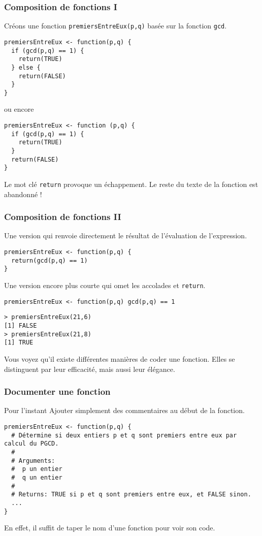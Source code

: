 \documentclass[10pt]{beamer}
\begin{document}
\begin{frame}[fragile]
  \frametitle{Composition de fonctions I}
  Créons une fonction \texttt{premiersEntreEux(p,q)} basée sur la fonction \texttt{gcd}.
  \begin{lstlisting}[style=editor]
premiersEntreEux <- function(p,q) {
  if (gcd(p,q) == 1) {
    return(TRUE)
  } else {
    return(FALSE)
  }
}    
\end{lstlisting}
ou encore
\begin{lstlisting}[style=editor]
premiersEntreEux <- function (p,q) {
  if (gcd(p,q) == 1) {
    return(TRUE)
  }
  return(FALSE)
}  
\end{lstlisting}
Le mot clé \alert{\texttt{return} provoque un échappement}. 
Le reste du texte de la fonction est abandonné !

\end{frame}


\begin{frame}[fragile]
  \frametitle{Composition de fonctions II}
 
Une version qui renvoie directement le résultat de l'évaluation de l'expression.
\begin{lstlisting}[style=editor]
premiersEntreEux <- function(p,q) {
  return(gcd(p,q) == 1)
}  
\end{lstlisting}

Une version encore plus courte qui omet les accolades et \texttt{return}.
\begin{lstlisting}[style=editor]
premiersEntreEux <- function(p,q) gcd(p,q) == 1
\end{lstlisting}

\begin{lstlisting}
> premiersEntreEux(21,6)
[1] FALSE
> premiersEntreEux(21,8)
[1] TRUE  
\end{lstlisting}

Vous voyez qu'il existe différentes manières de coder une fonction.
Elles se distinguent par leur \alert{efficacité}, mais aussi leur \alert{élégance}.


\end{frame}


\begin{frame}[fragile]
  \frametitle{Documenter une fonction}
  \begin{block}{Pour l'instant}
    Ajouter simplement des commentaires au début de la fonction.    
  \end{block}

\begin{lstlisting}
premiersEntreEux <- function(p,q) {
  # Détermine si deux entiers p et q sont premiers entre eux par calcul du PGCD.
  #
  # Arguments:
  #  p un entier
  #  q un entier
  #
  # Returns: TRUE si p et q sont premiers entre eux, et FALSE sinon.
  ...
}
\end{lstlisting}
En effet, il suffit de \alert{taper le nom d’une fonction pour voir son code}.
\end{frame}
\end{document}
